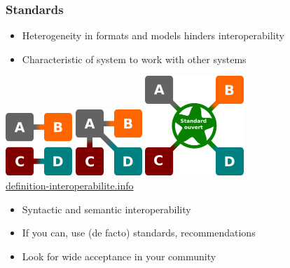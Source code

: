 \documentclass{beamer}
\begin{document}
\begin{frame}
  \frametitle{Standards}
  
  \begin{itemize}
  \item Heterogeneity in formats and models hinders interoperability
  \item Characteristic of system to work with other systems
  \end{itemize}
  \begin{center}
    \includegraphics[scale=0.5]{graphics/compatibility.png}\hspace{0.5cm}
    \includegraphics[scale=0.47]{graphics/de-facto-standard.png}\hspace{0.5cm}
    \includegraphics[scale=0.31]{graphics/interoperability.png}\\
    \tiny\url{definition-interoperabilite.info}
  \end{center}
  \begin{itemize}
  \item Syntactic and semantic interoperability
  \item If you can, use (de facto) standards, recommendations
  \item Look for wide acceptance in your community
  \end{itemize}
\end{frame}
\end{document}
